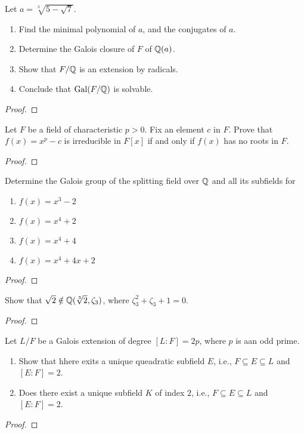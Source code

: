 \begin{problem}
Let $a=\sqrt[3]{5-\sqrt{7}}$.
\begin{enumerate}[label=(\alph*)]
\item Find the minimal polynomial of $a$, and the conjugates of $a$.
\item Determine the Galois closure of $F$ of $\mathbb{Q}(a)$.
\item Show that $F/\mathbb{Q}$ is an extension by radicals.
\item Conclude that $\operatorname{Gal}(F/\mathbb{Q})$ is solvable.
\end{enumerate}
\begin{proof}
\end{proof}
\end{problem}

\begin{problem}
Let $F$ be a field of characteristic $p>0$. Fix an element $c$ in
$F$. Prove that $f(x)=x^p-c$ is irreducible in $F[x]$ if and only if $f(x)$
has no roots in $F$.
\begin{proof}
\end{proof}
\end{problem}

\begin{problem}
Determine the Galois group of the splitting field over $\mathbb{Q}$ and all its
subfields for
\begin{enumerate}[label=(\alph*)]
\item $f(x)=x^3-2$
\item $f(x)=x^4+2$
\item $f(x)=x^4+4$
\item $f(x)=x^4+4x+2$
\end{enumerate}
\begin{proof}
\end{proof}
\end{problem}

\begin{problem}
Show that $\sqrt{2}\notin\mathbb{Q}(\sqrt[3]{2},\zeta_3)$, where
$\zeta_3^2+\zeta_3+1=0$.
\begin{proof}
\end{proof}
\end{problem}

\begin{problem}
Let $L/F$ be a Galois extension of degree $[L:F]=2p$, where $p$ is aan odd
prime.
\begin{enumerate}[label=(\alph*)]
\item Show that hhere exits a unique queadratic subfield $E$, i.e.,
  $F\subseteq E\subseteq L$ and $[E:F]=2$.
\item Does there exist a unique subfield $K$ of index $2$, i.e.,
  $F\subseteq E\subseteq L$ and $[E:F]=2$.
\end{enumerate}
\begin{proof}
\end{proof}
\end{problem}

